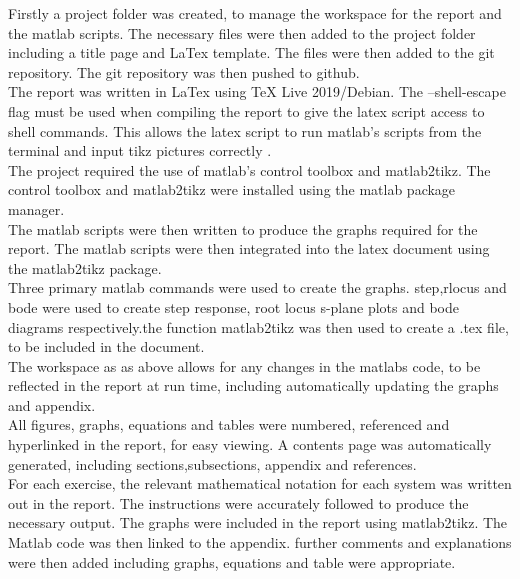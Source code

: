 \documentclass[12pt]{article}
\begin{document}
Firstly a project folder was created, to manage the workspace for the report and the matlab scripts. The necessary files were then added to the project folder including a title page and LaTex template. The files were then added to the git repository. The git repository was then pushed to github.\\

The report was written in LaTex using TeX Live 2019/Debian. The --shell-escape flag must be used when compiling the report to give the latex script access to shell commands. This allows the latex script to run matlab's scripts from the terminal and input tikz pictures correctly .\\ 

The project required the use of matlab's control toolbox and matlab2tikz. The control toolbox and matlab2tikz were installed using the matlab package manager.\\

The matlab scripts were then written to produce the graphs required for the report. The matlab scripts were then integrated into the latex document using the matlab2tikz package.\\

Three primary matlab commands were used to create the graphs. step,rlocus and bode were used to create step response, root locus s-plane plots and bode diagrams respectively.the function matlab2tikz was then used to create a .tex file, to be included in the document.\\

The workspace as as above allows for any changes in the matlabs code, to be reflected in the report at run time, including automatically updating the graphs and appendix.\\

All figures, graphs, equations and tables were numbered, referenced and hyperlinked in the report, for easy viewing. A contents page was automatically generated, including sections,subsections, appendix and references.\\

For each exercise, the relevant mathematical notation for each system was written out in the report. The instructions were accurately followed to produce the necessary output. The graphs were included in the report using matlab2tikz. The Matlab code was then linked to the appendix. further comments and explanations were then added including graphs, equations and table were appropriate. \\
\end{document}
